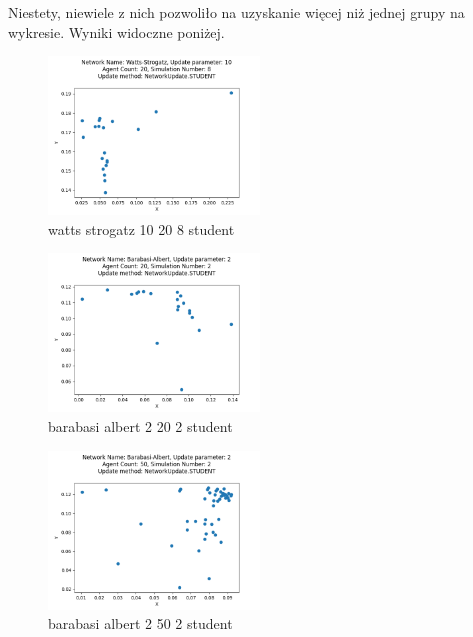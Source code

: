 \documentclass{wfiisul}
\begin{document}
Niestety, niewiele z nich pozwoliło na uzyskanie więcej niż jednej grupy na wykresie. Wyniki widoczne poniżej.

\begin{figure}
  \centering
  \includegraphics[width=0.5\textwidth]{img/watts_strogatz_10_20_8_student.png}
  \caption{watts strogatz 10 20 8 student}
  \label{fig:watts_strogatz_10_20_8_student}
\end{figure}

\begin{figure}
  \centering
  \includegraphics[width=0.5\textwidth]{img/barabasi_albert_2_20_2_student.png}
  \caption{barabasi albert 2 20 2 student}
  \label{fig:barabasi_albert_2_20_2_student}
\end{figure}

\begin{figure}
  \centering
  \includegraphics[width=0.5\textwidth]{img/barabasi_albert_2_50_2_student.png}
  \caption{barabasi albert 2 50 2 student}
  \label{fig:barabasi_albert_2_50_2_student}
\end{figure}
\end{document}
